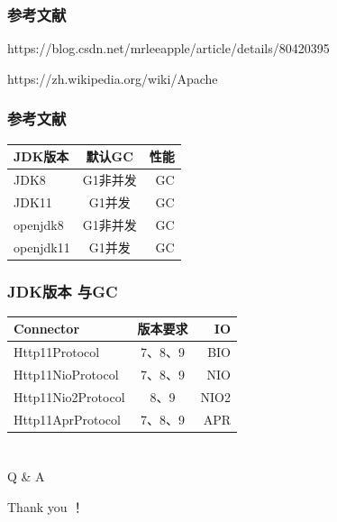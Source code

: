 \documentclass{beamer}
\begin{document}
\begin{frame}[allowframebreaks]
\frametitle{参考文献}
\small


https://blog.csdn.net/mrleeapple/article/details/80420395

https://zh.wikipedia.org/wiki/Apache%
\end{frame}

\begin{frame}[allowframebreaks]
\frametitle{参考文献}
\centering
\begin{tabular}{|l|c|r|}
\hline 
\large	JDK版本 &  \large 默认GC&  \large 性能 \\
\hline 
JDK8 & G1非并发 &  GC \\
\hline 
JDK11 & G1并发 & GC \\
\hline 
openjdk8 & G1非并发& GC  \\
\hline 
openjdk11& G1并发 & GC \\
\hline
\end{tabular}
\end{frame}

\begin{frame}[allowframebreaks]
\frametitle{JDK版本 与GC}
\centering
\begin{tabular}{|l|c|r|}
\hline 
\large	Connector&  \large 版本要求&  \large IO \\
\hline 
Http11Protocol & 7、8、9 & BIO \\
\hline 
Http11NioProtocol & 7、8、9 & NIO \\
\hline 
Http11Nio2Protocol & 8、9& NIO2  \\
\hline 
Http11AprProtocol& 7、8、9 & APR \\
\hline
\end{tabular}
\end{frame}

\section*{}




\begin{frame}
\centering
\Huge Q \& A
\end{frame}

\begin{frame}
\centering
\Huge Thank you ！
\end{frame}
\end{document}

